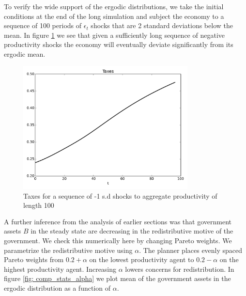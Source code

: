 \documentclass[thmsb,11pt]{article}
\begin{document}
To verify the wide support of the ergodic distributions,
we take the initial conditions at the end of the long simulation and subject the economy to a sequence of 100 periods of $\epsilon_t$ shocks that  are 2 standard deviations below the mean.  In figure \ref{fig: wide support of taxes} we see that given a sufficiently long sequence of negative productivity  shocks the economy will eventually deviate significantly from its ergodic mean.


{
  \begin{figure}
  \label{fig: wide support of taxes}
    \centering
    \includegraphics[width = 0.8\textwidth]{cesplots/taxes_only_bad_shocks.png}
    \caption{Taxes for a sequence of -1 s.d shocks to aggregate productivity of length 100}
  \end{figure}

}

A further inference from the analysis of earlier sections was that government assets $B$  in the steady state are decreasing in the redistributive motive of the government.
We check this numerically here  by changing  Pareto weights.
We parametrize the redistributive motive using  $\alpha$.  The planner places evenly spaced Pareto weights from $0.2+\alpha$
on the lowest productivity agent to $0.2-\alpha$ on the highest productivity agent. Increasing $\alpha$ lowers concerns for redistribution.
In figure \ref{fig: comp_stats_alpha} we plot mean of the government assets in the ergodic distribution as a function of $\alpha$.
\end{document}
